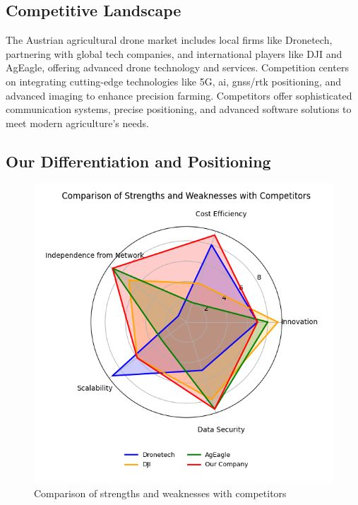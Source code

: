\subsection{Competitive Landscape}

The Austrian agricultural drone market includes local firms like Dronetech, partnering with global tech companies, and international players like DJI and AgEagle, offering advanced drone technology and services. Competition centers on integrating cutting-edge technologies like 5G, \acrshort{ai}, \acrshort{gnss}/\acrshort{rtk} positioning, and advanced imaging to enhance precision farming. Competitors offer sophisticated communication systems, precise positioning, and advanced software solutions to meet modern agriculture's needs.

\subsection{Our Differentiation and Positioning}

\begin{figure}[H] 
	\centering 
	\hspace*{-1.5cm} 
	\includegraphics[width=400pt]{figures/competitors.png} 
	\caption{Comparison of strengths and weaknesses with competitors}
	\label{fig:strengths_weaknesses} 
\end{figure}

